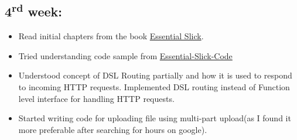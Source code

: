 \documentclass{article}
\begin{document}
\subsection*{4\textsuperscript{rd} week:}
\begin{itemize}
    \item Read initial chapters from the book \href{http://underscore.io/books/essential-slick/}{Essential Slick}.
    \item Tried understanding code sample from \href{https://github.com/abhayptp/essential-slick-code}{Essential-Slick-Code}
    \item Understood concept of DSL Routing partially and how it is used to respond to incoming HTTP requests. Implemented DSL routing instead of Function level interface for handling HTTP requests. 
    \item Started writing code for uploading file using multi-part upload(as I found it more preferable after searching for hours on google).
    
    
\end{itemize}
\end{document}
